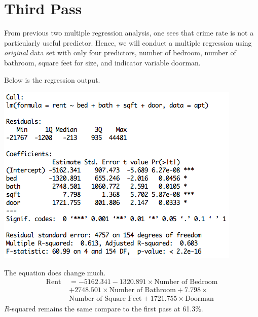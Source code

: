 \documentclass[a4 paper, 11 pt, twocolumn]{article}
\begin{document}
\section{Third Pass}
From previous two multiple regression analysis, one sees that crime rate is not a particularly useful predictor. Hence, we will conduct a multiple regression using \textit{original} data set with only four predictors, number of bedroom, number of bathroom, square feet for size, and indicator variable doorman.

Below is the regression output.
\begin{center}
\includegraphics[scale=0.5]{mr3}
\end{center}
The equation does change much.
\begin{align*}
\text{Rent } &= -5162.341 -1320.891\times \text{Number of Bedroom} \\
&+ 2748.501\times \text{Number of Bathroom} + 7.798 \times \\ &\text{Number of Square Feet} +1721.755\times \text{Doorman}
\end{align*}
$R$-squared remains the same compare to the first pass at 61.3\%.
\end{document}
